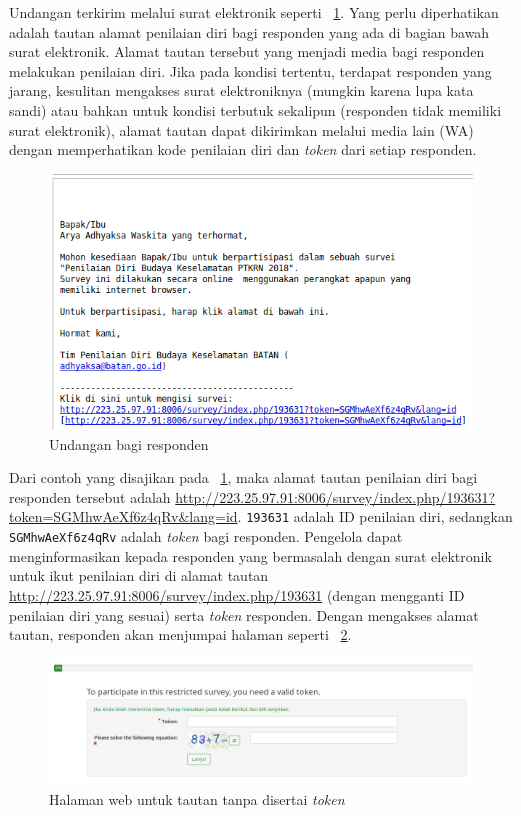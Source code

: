  Undangan terkirim melalui surat elektronik seperti \figurename~\ref{fig:undangan3}. Yang perlu diperhatikan adalah tautan alamat penilaian diri bagi responden yang ada di bagian bawah surat elektronik. Alamat tautan tersebut yang menjadi media bagi responden melakukan penilaian diri. Jika pada kondisi tertentu, terdapat responden yang jarang, kesulitan mengakses surat elektroniknya (mungkin karena lupa kata sandi) atau bahkan untuk kondisi terbutuk sekalipun (responden tidak memiliki surat elektronik), alamat tautan dapat dikirimkan melalui media lain (WA) dengan memperhatikan kode penilaian diri dan \textit{token} dari setiap responden.
 
 \begin{figure}
   \begin{center}
     \includegraphics[scale=.5]{pics/undangan3.png}
     \caption{Undangan bagi responden}
     \label{fig:undangan3}
   \end{center}
 \end{figure}
 

 Dari contoh yang disajikan pada \figurename~\ref{fig:undangan3}, maka alamat tautan penilaian diri bagi responden tersebut adalah \url{http://223.25.97.91:8006/survey/index.php/193631?token=SGMhwAeXf6z4qRv&lang=id}. \texttt{193631} adalah ID penilaian diri, sedangkan \texttt{SGMhwAeXf6z4qRv} adalah \textit{token} bagi responden. Pengelola dapat menginformasikan kepada responden yang bermasalah dengan surat elektronik untuk ikut penilaian diri di alamat tautan \url{http://223.25.97.91:8006/survey/index.php/193631} (dengan mengganti ID penilaian diri yang sesuai) serta \textit{token} responden. Dengan mengakses alamat tautan, responden akan menjumpai halaman seperti \figurename~\ref{fig:tanpaToken}.
 
 \begin{figure}
   \begin{center}
     \includegraphics[scale=.4]{pics/tanpaEmail.png}
     \caption{Halaman web untuk tautan tanpa disertai \textit{token}}
     \label{fig:tanpaToken}
   \end{center}
 \end{figure}
 
